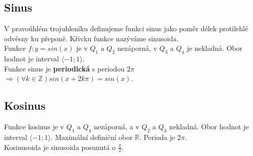 \documentclass[12pt, a4paper]{article}
\newcommand{\imply}{\Rightarrow}
\begin{document}
\subsection*{Sinus}
V pravoúhlém trojuhleníku definujeme funkci sinus jako poměr délek protilehlé odvěsny ku přeponě. Křivku funkce nazýváme sinusoida.\\
Funkce $f: y = sin(x)$ je v $Q_1$ a $Q_2$ nezáporná, v $Q_3$ a $Q_4$ je nekladná. Obor hodnot je interval $\langle -1;1 \rangle$.\\
Funkce sinus je \textbf{periodická} s periodou $2\pi$ $\imply (\forall k \in \mathbb{Z})  sin(x+2k\pi)=sin(x)$.\\
\begin{figure}[H]    
	\centering
\end{figure}

\subsection*{Kosinus}
Funkce kosinus je v $Q_1$ a $Q_4$ nezáporná, a v $Q_2$ a $Q_3$ nekladná. Obor hodnot je interval $\langle -1;1 \rangle$. Maximální definiční obor $\mathbb{R}$. Perioda je $2\pi$.\\
Kosinusoida je sinusoida posunutá o $\frac{\pi}{2}$.
\begin{figure}[H]    
	\centering
\end{figure}
\end{document}
